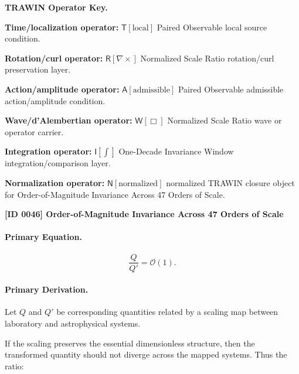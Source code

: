 \par\vspace{0.45\baselineskip}
\noindent\begin{minipage}[t]{\linewidth}
\begingroup
\small
\raggedright
\textbf{TRAWIN Operator Key.}\par
\noindent\textbf{Time/localization operator:} $\mathsf{T}\!\left[\mathrm{local}\right]$ Paired Observable local source condition.\par
\noindent\textbf{Rotation/curl operator:} $\mathsf{R}\!\left[\nabla\times\right]$ Normalized Scale Ratio rotation/curl preservation layer.\par
\noindent\textbf{Action/amplitude operator:} $\mathsf{A}\!\left[\mathrm{admissible}\right]$ Paired Observable admissible action/amplitude condition.\par
\noindent\textbf{Wave/d'Alembertian operator:} $\mathsf{W}\!\left[\Box\right]$ Normalized Scale Ratio wave or operator carrier.\par
\noindent\textbf{Integration operator:} $\mathsf{I}\!\left[\int\right]$ One-Decade Invariance Window integration/comparison layer.\par
\noindent\textbf{Normalization operator:} $\mathsf{N}\!\left[\mathrm{normalized}\right]$ normalized TRAWIN closure object for Order-of-Magnitude Invariance Across 47 Orders of Scale.\par
\endgroup
\end{minipage}

\clearpage
\noindent\textbf{[ID 0046] Order-of-Magnitude Invariance Across 47 Orders of Scale}\par
\vspace{0.35em}
\paragraph{Primary Equation.}
\begin{equation}
\frac{Q}{Q'}
=
\mathcal{O}(1).
\end{equation}

\paragraph{Primary Derivation.}
Let $Q$ and $Q'$ be corresponding quantities related by a scaling map between laboratory and astrophysical systems.

If the scaling preserves the essential dimensionless structure, then the transformed quantity should not diverge across the mapped systems. Thus the ratio:

